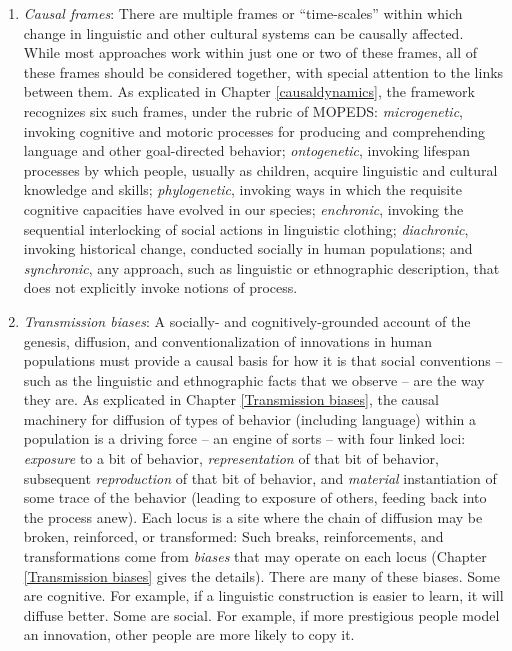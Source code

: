 \begin{enumerate}
\item[] {\textit{Causal frames}: There are multiple frames or ``time-scales'' within which change in linguistic and other cultural systems can be causally affected. While most approaches work within just one or two of these frames, all of these frames should be considered together, with special attention to the links between them. As explicated in Chapter \ref{causaldynamics}, the framework recognizes six such frames, under the rubric of MOPEDS: \textit{microgenetic}, invoking cognitive and motoric processes for producing and comprehending language and other goal-directed behavior; \textit{ontogenetic}, invoking lifespan processes by which people, usually as children, acquire linguistic and cultural knowledge and skills; \textit{phylogenetic}, invoking ways in which the requisite cognitive capacities have evolved in our species; \textit{enchronic}, invoking the sequential interlocking of social actions in linguistic clothing; \textit{diachronic}, invoking historical change, conducted socially in human populations; and \textit{synchronic}, any approach, such as linguistic or ethnographic description, that does not explicitly invoke notions of process.}

\item[] {\textit{Transmission biases}: A socially- and cognitively-grounded account of the genesis, diffusion, and conventionalization of innovations in human populations must provide a causal basis for how it is that social conventions -- such as the linguistic and ethnographic facts that we observe -- are the way they are. As explicated in Chapter \ref{Transmission biases}, the causal machinery for diffusion of types of behavior (including language) within a population is a driving force -- an engine of sorts -- with four linked loci: \textit{exposure} to a bit of behavior, \textit{representation} of that bit of behavior, subsequent \textit{reproduction} of that bit of behavior, and \textit{material} instantiation of some trace of the behavior (leading to exposure of others, feeding back into the process anew). Each locus is a site where the chain of diffusion may be broken, reinforced, or transformed: Such breaks, reinforcements, and transformations come from \textit{biases} that may operate on each locus (Chapter \ref{Transmission biases} gives the details). There are many of these biases. Some are cognitive. For example, if a linguistic construction is easier to learn, it will diffuse better. Some are social. For example, if more prestigious people model an innovation, other people are more likely to copy it. }
\end{enumerate}

